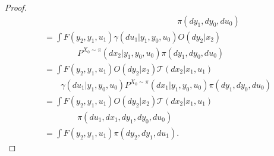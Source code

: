 \documentclass[10pt,a4paper]{amsart}
\begin{document}
\begin{proof}
\begin{align*}
&\qquad\qquad\qquad\qquad\qquad\qquad\qquad\qquad\pi(dy_1,dy_0,du_0)\\
&=\int F(y_2,y_1,u_1)\gamma(du_1|y_1,y_0,u_0)O(dy_2|x_2)\\
&\qquad\qquad P^{X_0\sim \pi}(dx_2| y_1,y_0,u_0)\pi(dy_1,dy_0,du_0)\\
&=\int  F(y_2,y_1,u_1)O(dy_2|x_2)\mathcal{T}(dx_2|x_1,u_1)\\
&\qquad \gamma(du_1|y_1,y_0,u_0) P^{X_0\sim \pi}(dx_1| y_1,y_0,u_0)\pi(dy_1,dy_0,du_0)\\
&=\int  F(y_2,y_1,u_1)O(dy_2|x_2)\mathcal{T}(dx_2|x_1,u_1)\\
&\qquad\qquad \pi(du_1,dx_1,dy_1,dy_0,du_0)\\
&=\int  F(y_2,y_1,u_1)\pi(dy_2,dy_1,du_1).
\end{align*}
\end{proof}
\end{document}
